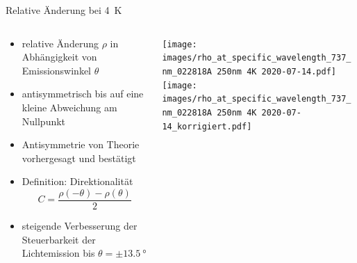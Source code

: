 \begin{frame}{Relative Änderung bei \SI{4}{\kelvin}}
    \begin{columns}
        \begin{column}{0.5\textwidth}
            \begin{itemize}
                \item <1-> relative Änderung $\rho$ in Abhängigkeit von Emissionswinkel $\theta$
                \item <2-> antisymmetrisch bis auf eine kleine Abweichung am Nullpunkt 
                \item <3-> Antisymmetrie von Theorie vorhergesagt und bestätigt
                \bigskip
                \item <4-> Definition: Direktionalität
                \begin{equation*}
                    C= \frac{\rho(-\theta)-\rho(\theta)}{2}                    
                \end{equation*}
                \item <6-> steigende Verbesserung der Steuerbarkeit der Lichtemission bis $\theta = \pm \SI{13,5}{\degree}$
            \end{itemize}
        \end{column}
        \begin{column}{0.5\textwidth}
            \centering 
             {%
            \texttt{[image: images/rho\_at\_specific\_wavelength\_737\_nm\_022818A 250nm 4K 2020-07-14.pdf]}\\[-0.5\baselineskip]%
            }%
             {%
            \texttt{[image: images/rho\_at\_specific\_wavelength\_737\_nm\_022818A 250nm 4K 2020-07-14\_korrigiert.pdf]}\\[-0.5\baselineskip]%
            }%
        \end{column}
    \end{columns}
\end{frame}

